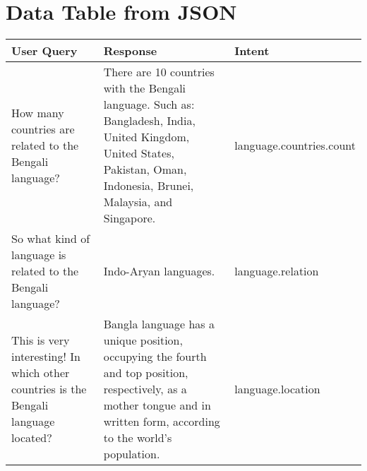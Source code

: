 \documentclass{article}
\begin{document}
\section*{Data Table from JSON}
\begin{tabular}{|p{4cm}|p{6cm}|p{3cm}|}
\hline
\textbf{User Query} & \textbf{Response} & \textbf{Intent} \\
\hline
How many countries are related to the Bengali language? & There are 10 countries with the Bengali language. Such as: Bangladesh, India, United Kingdom, United States, Pakistan, Oman, Indonesia, Brunei, Malaysia, and Singapore. & language.countries.count \\
\hline
So what kind of language is related to the Bengali language? & Indo-Aryan languages. & language.relation \\
\hline
This is very interesting! In which other countries is the Bengali language located? & Bangla language has a unique position, occupying the fourth and top position, respectively, as a mother tongue and in written form, according to the world's population. & language.location \\
\hline
\end{tabular}
\end{document}
